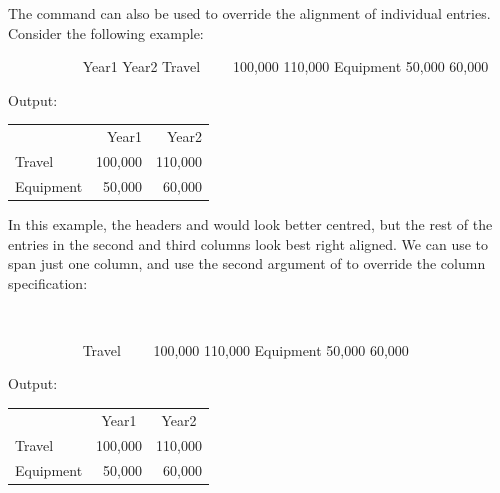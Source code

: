 The  command can also be used to override
the alignment of individual entries.  Consider
the following example:
\begin{code}
\newline
\strut~~~~~~~~~~ Year1    Year2
\newline
Travel~~~~ 100,000 
110,000\newline
Equipment  50,000   60,000\newline
{}
\end{code}
Output:
\begin{result}
\begin{tabular}{lrr}
 & Year1 & Year2 \\
Travel & 100,000 & 110,000\\
Equipment & 50,000 & 60,000
\end{tabular}
\end{result}%
In this example, the headers  and  would look
better centred, but the rest of the entries in the second
and third columns look best right aligned.  We can
use  to span just one column, and
use the second argument of  to override
the column specification:
\begin{code}
\newline
\strut~~~~~~~~~~ \newline
\strut~~~~~~~~~~ \newline
Travel~~~~ 100,000  110,000\newline
Equipment  50,000   60,000\newline
{}
\end{code}
Output:
\begin{result}
\begin{tabular}{lrr}
 & \multicolumn{1}{c}{Year1} & \multicolumn{1}{c}{Year2} \\
Travel & 100,000 & 110,000\\
Equipment & 50,000 & 60,000
\end{tabular}
\end{result}

